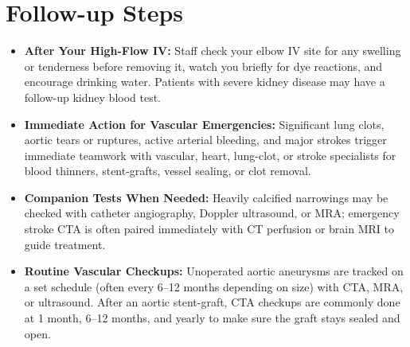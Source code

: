 \section{Follow-up Steps}
\begin{itemize}
    \item \textbf{After Your High-Flow IV:} Staff check your elbow IV site for any swelling or tenderness before removing it, watch you briefly for dye reactions, and encourage drinking water. Patients with severe kidney disease may have a follow-up kidney blood test.
    \item \textbf{Immediate Action for Vascular Emergencies:} Significant lung clots, aortic tears or ruptures, active arterial bleeding, and major strokes trigger immediate teamwork with vascular, heart, lung-clot, or stroke specialists for blood thinners, stent-grafts, vessel sealing, or clot removal.
    \item \textbf{Companion Tests When Needed:} Heavily calcified narrowings may be checked with catheter angiography, Doppler ultrasound, or MRA; emergency stroke CTA is often paired immediately with CT perfusion or brain MRI to guide treatment.
    \item \textbf{Routine Vascular Checkups:} Unoperated aortic aneurysms are tracked on a set schedule (often every 6--12 months depending on size) with CTA, MRA, or ultrasound. After an aortic stent-graft, CTA checkups are commonly done at 1 month, 6--12 months, and yearly to make sure the graft stays sealed and open.
\end{itemize}

